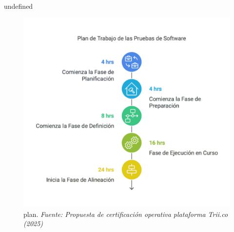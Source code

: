 \documentclass[
  paper=a4,
  ,captions=tableheading
]{scrartcl}
\renewenvironment{quote}{\begin{customblockquote}\list{}{\rightmargin=0em\leftmargin=0em}%
\item\relax\color{blockquote-text}\ignorespaces}{\unskip\unskip\endlist\end{customblockquote}}
\begin{document}
\begin{quote}
undefined
\end{quote}

\begin{figure}
\centering
\includegraphics{images/plan.png}
\caption{plan. \emph{Fuente: Propuesta de certificación operativa
plataforma Trii.co
(2025)}}\label{fig:id-49930878d254405eba38b006b1b9f180}
\end{figure}
\end{document}
